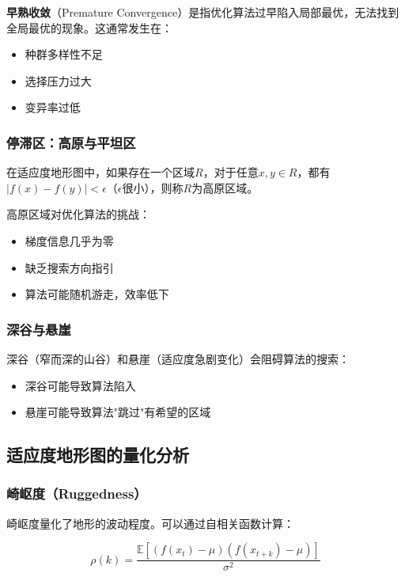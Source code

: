\textbf{早熟收敛}（Premature Convergence）是指优化算法过早陷入局部最优，无法找到全局最优的现象。这通常发生在：
\begin{itemize}
    \item 种群多样性不足
    \item 选择压力过大
    \item 变异率过低
\end{itemize}

\subsubsection{停滞区：高原与平坦区}

\begin{definition}[高原区域]
在适应度地形图中，如果存在一个区域$R$，对于任意$x, y \in R$，都有$|f(x) - f(y)| < \epsilon$（$\epsilon$很小），则称$R$为高原区域。
\end{definition}

高原区域对优化算法的挑战：
\begin{itemize}
    \item 梯度信息几乎为零
    \item 缺乏搜索方向指引
    \item 算法可能随机游走，效率低下
\end{itemize}

\subsubsection{深谷与悬崖}

深谷（窄而深的山谷）和悬崖（适应度急剧变化）会阻碍算法的搜索：
\begin{itemize}
    \item 深谷可能导致算法陷入
    \item 悬崖可能导致算法"跳过"有希望的区域
\end{itemize}

\subsection{适应度地形图的量化分析}

\subsubsection{崎岖度（Ruggedness）}

崎岖度量化了地形的波动程度。可以通过自相关函数计算：

\[
\rho(k) = \frac{\mathbb{E}[(f(x_t) - \mu)(f(x_{t+k}) - \mu)]}{\sigma^2}
\]

